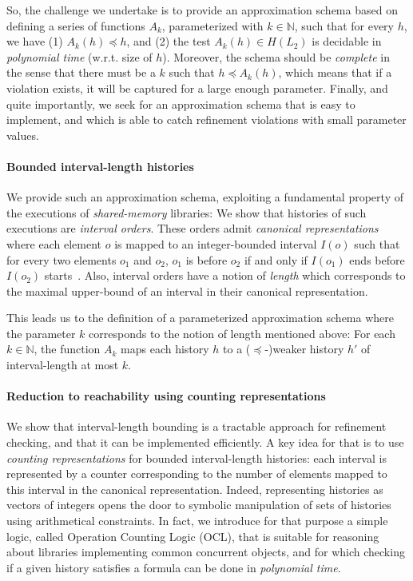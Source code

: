 So, the challenge we undertake is to provide an approximation schema based on
defining a series of functions $A_k$, parameterized with $k \in \mathbb{N}$,
such that for every $h$, we have (1) $A_k (h) \preceq h$, and (2) the test
$A_k(h) \in H(L_2)$ is decidable in \emph{polynomial time} (w.r.t. size of $h$).
Moreover, the schema should be \emph{complete} in the sense that there must be a
$k$ such that $h \preceq A_k(h)$, which means that if a violation exists, it
will be captured for a large enough parameter. Finally, and quite importantly,
we seek for an approximation schema that is easy to implement, and which is
able to catch refinement violations with small parameter values.

\paragraph{Bounded interval-length histories}

We provide such an approximation schema, exploiting a fundamental
property of the executions of \emph{shared-memory} libraries: We show
that histories of such executions are \emph{interval orders}. These orders
admit \emph{canonical representations} where each element $o$ is
mapped to an integer-bounded interval $I(o)$ such that for every two elements
$o_1$ and $o_2$, $o_1$ is before $o_2$ if and only if $I(o_1)$ ends before
$I(o_2)$ starts~\cite{phd/Greenough76}. Also, interval orders have a 
notion of \emph{length} which corresponds to the maximal upper-bound of an
interval in their canonical representation.

This leads us to the definition of a parameterized approximation
schema where the parameter $k$ corresponds to the notion of length
mentioned above: For each $k \in \mathbb{N}$, the function $A_k$ maps each
history $h$ to a ($\preceq$-)weaker history $h'$ of interval-length at most $k$. 

\paragraph{Reduction to reachability using counting representations}

We show that interval-length bounding is a tractable approach for
refinement checking, and that it can be implemented efficiently. A key idea for
that is to use \emph{counting representations} for bounded interval-length
histories: each interval is represented by a counter corresponding to the
number of elements mapped to this interval in the canonical representation.
Indeed, representing histories as vectors of integers opens the door
to symbolic manipulation of sets of histories using arithmetical constraints.
In fact, we introduce for that purpose a simple logic, called 
Operation Counting Logic (OCL), that is suitable for reasoning about libraries
implementing common concurrent objects, and for which checking if a given
history satisfies a formula can be done in \emph{polynomial time}.

